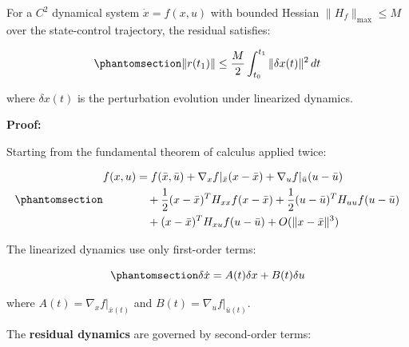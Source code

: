 \documentclass[
  letterpaper,
  DIV=11,
  numbers=noendperiod]{scrartcl}
\begin{document}
\begin{tcolorbox}[enhanced jigsaw, breakable, bottomtitle=1mm, title=\textcolor{quarto-callout-important-color}{\faExclamation}\hspace{0.5em}{Theorem 1.1: Quantitative Residual Bound}, opacityback=0, left=2mm, titlerule=0mm, colframe=quarto-callout-important-color-frame, opacitybacktitle=0.6, bottomrule=.15mm, toptitle=1mm, toprule=.15mm, arc=.35mm, leftrule=.75mm, rightrule=.15mm, colback=white, colbacktitle=quarto-callout-important-color!10!white, coltitle=black]

For a \(C^2\) dynamical system \(\dot{x} = f(x, u)\) with bounded
Hessian \(\|H_f\|_{\max} \leq M\) over the state-control trajectory, the
residual satisfies:

\begin{equation}\phantomsection\label{eq-residual-bound}{
\| r(t_1) \| \leq \frac{M}{2} \int_{t_0}^{t_1} \| \delta x(t) \|^2 \, dt
}\end{equation}

where \(\delta x(t)\) is the perturbation evolution under linearized
dynamics.

\end{tcolorbox}

\textbf{Proof:}

Starting from the fundamental theorem of calculus applied twice:

\begin{equation}\phantomsection\label{eq-taylor-expansion}{
\begin{aligned}
f(x, u) &= f(\bar{x}, \bar{u}) + \nabla_x f|_{\bar{x}} (x - \bar{x}) + \nabla_u f|_{\bar{u}} (u - \bar{u}) \\
&\quad + \frac{1}{2} (x - \bar{x})^T H_{xx} f (x - \bar{x}) + \frac{1}{2} (u - \bar{u})^T H_{uu} f (u - \bar{u}) \\
&\quad + (x - \bar{x})^T H_{xu} f (u - \bar{u}) + O(\|x - \bar{x}\|^3)
\end{aligned}
}\end{equation}

The linearized dynamics use only first-order terms:

\begin{equation}\phantomsection\label{eq-linearized-dynamics}{
\delta \dot{x} = A(t) \delta x + B(t) \delta u
}\end{equation}

where \(A(t) = \nabla_x f|_{\bar{x}(t)}\) and
\(B(t) = \nabla_u f|_{\bar{u}(t)}\).

The \textbf{residual dynamics} are governed by second-order terms:
\end{document}

